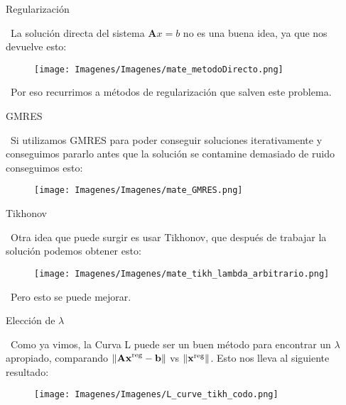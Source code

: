 \documentclass[12pt]{beamer}
\begin{document}
	\begin{frame}{Regularización}
		
		\ La solución directa del sistema $\mathbf Ax=b$ no es una buena idea, ya que nos devuelve esto:
		
		\begin{figure}[htp]
			\centering
			\texttt{[image: Imagenes/Imagenes/mate\_metodoDirecto.png]}
		\end{figure}
		
		\ Por eso recurrimos a métodos de regularización que salven este problema.
		
	\end{frame}
	
	\begin{frame}{GMRES}
		
		\ Si utilizamos GMRES para poder conseguir soluciones iterativamente y conseguimos pararlo antes que la solución se contamine demasiado de ruido conseguimos esto:
		
		\begin{figure}[htp]
			\centering
			\texttt{[image: Imagenes/Imagenes/mate\_GMRES.png]}
		\end{figure}
		
	\end{frame}
	
	\begin{frame}{Tikhonov}
		
		\ Otra idea que puede surgir es usar Tikhonov, que después de trabajar la solución podemos obtener esto:
		
		\begin{figure}[htp]
			\centering
			\texttt{[image: Imagenes/Imagenes/mate\_tikh\_lambda\_arbitrario.png]}
		\end{figure}
		
		\ Pero esto se puede mejorar.
		
	\end{frame}
	
	\begin{frame}{Elección de $\lambda$}
		
		\ Como ya vimos, la Curva L puede ser un buen método para encontrar un $\lambda$ apropiado, comparando $\|\mathbf{Ax}^{\rm reg} - \mathbf{b}\|$ vs $\|\mathbf{x}^{\rm reg}\|$. Esto nos lleva al siguiente resultado:
		
		\begin{figure}[htp]
			\centering
			\texttt{[image: Imagenes/Imagenes/L\_curve\_tikh\_codo.png]}
		\end{figure}
		
	\end{frame}
	
\end{document}
